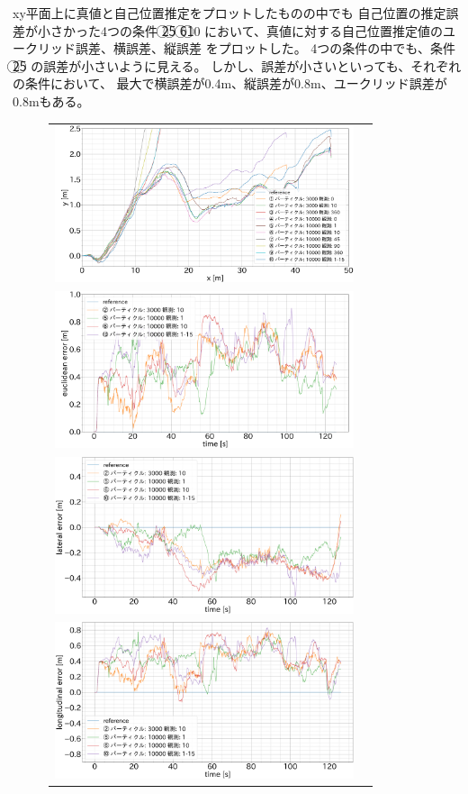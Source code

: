 \documentclass{jarticle}
\begin{document}
xy平面上に真値と自己位置推定をプロットしたものの中でも
自己位置の推定誤差が小さかった4つの条件
\textcircled{\scriptsize 2}\textcircled{\scriptsize 5}\noindent
\textcircled{\scriptsize 6}\textcircled{\scriptsize 10}\noindent
において、真値に対する自己位置推定値のユークリッド誤差、横誤差、縦誤差
をプロットした。
4つの条件の中でも、条件
\textcircled{\scriptsize 2}\textcircled{\scriptsize 5}\noindent
の誤差が小さいように見える。
しかし、誤差が小さいといっても、それぞれの条件において、
最大で横誤差が0.4m、縦誤差が0.8m、ユークリッド誤差が0.8mもある。

\begin{figure}[htbp]
  \begin{center}
  \begin{tabular}{cc}
  \includegraphics[height=46mm]{fig/x_y.png} \\
  \includegraphics[height=46mm]{fig/euclidean_error.png} \\
  \includegraphics[height=46mm]{fig/lateral_error.png} \\
  \includegraphics[height=46mm]{fig/longitudinal_error.png} 

\end{tabular}
\end{center}
\end{figure}
\end{document}

